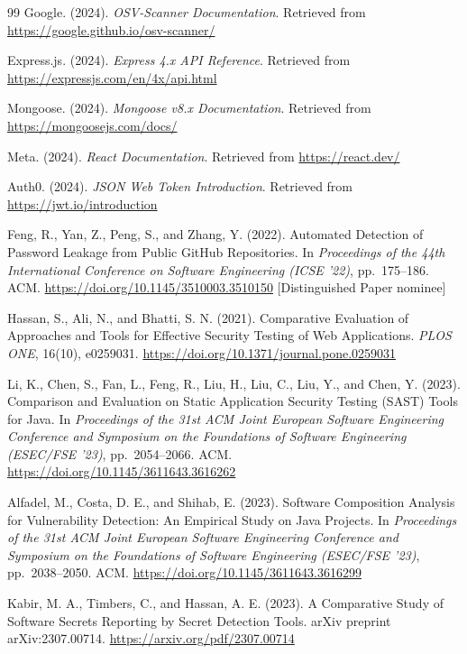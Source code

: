 \documentclass[12pt,a4paper]{report}
\begin{document}
\begin{thebibliography}{99}
Google. (2024). \textit{OSV-Scanner Documentation}. Retrieved from \url{https://google.github.io/osv-scanner/}

Express.js. (2024). \textit{Express 4.x API Reference}. Retrieved from \url{https://expressjs.com/en/4x/api.html}

Mongoose. (2024). \textit{Mongoose v8.x Documentation}. Retrieved from \url{https://mongoosejs.com/docs/}

Meta. (2024). \textit{React Documentation}. Retrieved from \url{https://react.dev/}

Auth0. (2024). \textit{JSON Web Token Introduction}. Retrieved from \url{https://jwt.io/introduction}


Feng, R., Yan, Z., Peng, S., and Zhang, Y. (2022). Automated Detection of Password Leakage from Public GitHub Repositories. In \textit{Proceedings of the 44th International Conference on Software Engineering (ICSE '22)}, pp.\ 175--186. ACM. \url{https://doi.org/10.1145/3510003.3510150} [Distinguished Paper nominee]

Hassan, S., Ali, N., and Bhatti, S. N. (2021). Comparative Evaluation of Approaches and Tools for Effective Security Testing of Web Applications. \textit{PLOS ONE}, 16(10), e0259031. \url{https://doi.org/10.1371/journal.pone.0259031}

Li, K., Chen, S., Fan, L., Feng, R., Liu, H., Liu, C., Liu, Y., and Chen, Y. (2023). Comparison and Evaluation on Static Application Security Testing (SAST) Tools for Java. In \textit{Proceedings of the 31st ACM Joint European Software Engineering Conference and Symposium on the Foundations of Software Engineering (ESEC/FSE '23)}, pp.\ 2054--2066. ACM. \url{https://doi.org/10.1145/3611643.3616262}

Alfadel, M., Costa, D. E., and Shihab, E. (2023). Software Composition Analysis for Vulnerability Detection: An Empirical Study on Java Projects. In \textit{Proceedings of the 31st ACM Joint European Software Engineering Conference and Symposium on the Foundations of Software Engineering (ESEC/FSE '23)}, pp.\ 2038--2050. ACM. \url{https://doi.org/10.1145/3611643.3616299}

Kabir, M. A., Timbers, C., and Hassan, A. E. (2023). A Comparative Study of Software Secrets Reporting by Secret Detection Tools. arXiv preprint arXiv:2307.00714. \url{https://arxiv.org/pdf/2307.00714}


\end{thebibliography}
\end{document}
